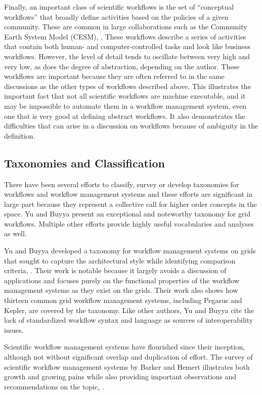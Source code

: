 Finally, an important class of scientific workflows is the set of ``conceptual
workflows'' that broadly define activities based on the policies of a given
community. These are common in large collaborations such as the Community Earth
System Model (CESM), \cite{noauthor_cesm_nodate}. These workflows describe a
series of activities that contain both human- and computer-controlled tasks
and look like business workflows. However, the level of detail tends to
oscillate between very high and very low, as does the degree of abstraction,
depending on the author. These workflows are important because they are often
referred to in the same discussions as the other types of workflows described
above. This illustrates the important fact that not all scientific workflows are
machine executable, and it may be impossible to automate them in a workflow
management system, even one that is very good at defining abstract workflows. It
also demonstrates the difficulties that can arise in a discussion on workflows
because of ambiguity in the definition.

\subsection{Taxonomies and Classification}\label{taxonomies-and-classification}
There have been several efforts to classify, survey or develop taxonomies for
workflows and workflow management systems and these efforts are significant in
large part because they represent a collective call for higher order concepts in
the space. Yu and Buyya present an exceptional and noteworthy taxonomy for grid
workflows. Multiple other efforts provide highly useful vocabularies and
analyses as well.

Yu and Buyya developed a taxonomy for workflow management systems on grids that
sought to capture the architectural style while identifying comparison criteria,
\cite{yu_taxonomy_2005}. Their work is notable because it largely avoids a
discussion of applications and focuses purely on the functional properties of
the workflow management systems as they exist on the grids. Their work also
shows how thirteen common grid workflow management systems, including Pegasus
and Kepler, are covered by the taxonomy. Like other authors, Yu and Buyya cite
the lack of standardized workflow syntax and language as sources of
interoperability issues.

Scientific workflow management systems have flourished since their inception,
although not without significant overlap and duplication of effort. The survey
of scientific workflow management systems by Barker and Hemert illustrates both
growth and growing pains while also providing important observations and
recommendations on the topic, \cite{barker_scientific_2007}.

